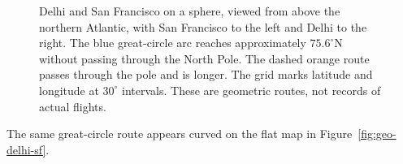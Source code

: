 \begin{figure}[htbp]
\caption{Delhi and San Francisco on a sphere, viewed from above
the northern Atlantic, with San Francisco to the left and Delhi
to the right. The blue great-circle arc reaches approximately
$75.6^\circ$N without passing through the North Pole.
The dashed orange route passes through the pole and is longer.
The grid marks latitude and longitude at $30^\circ$ intervals.
These are geometric routes, not records of actual flights.}
\label{fig:geo-delhi-sf-globe}
\end{figure}

The same great-circle route appears curved on the flat map in
Figure~\ref{fig:geo-delhi-sf}.


